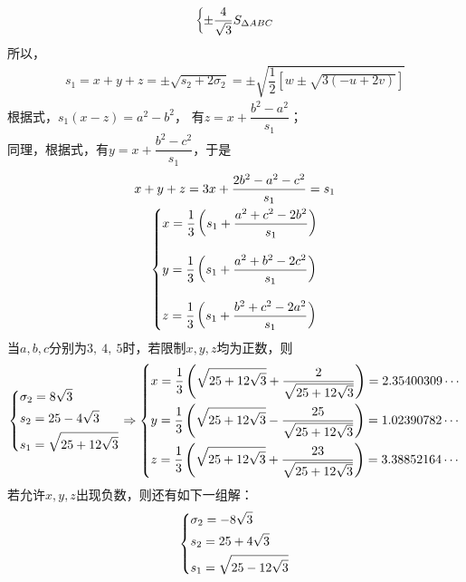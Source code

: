 \begin{enumerate}[label={【\textbf{例\thechapter.\arabic*}】},
 leftmargin=\inteval{\myenumleftmargin}pt,
 itemsep=\inteval{\myenumitempsep}pt,
 itemindent=\inteval{\myenumitemindent}pt]
\begin{align*}
\begin{dcases}
        \pm\dfrac{4}{\sqrt{3}}S_{\Delta ABC} 
    \end{dcases}
\end{align*}
所以，
\begin{gather*}
    s_1=x+y+z=\pm\sqrt{s_2+2\sigma_2 }=
    \pm \sqrt{\dfrac{1}{2}[w\pm\sqrt{3(-u+2v)}]}
\end{gather*}
根据式，$ s_1(x-z)=a^2-b^2 $，
有$ z=x+\dfrac{b^2-a^2}{s_1} $；\\
同理，根据式，有$ y=x+\dfrac{b^2-c^2}{s_1} $，于是
\begin{gather*}
    x+y+z=3x+\dfrac{2b^2-a^2-c^2}{s_1}=s_1 \\
    \begin{dcases}
        x=\dfrac{1}{3}\left(s_1+\dfrac{a^2+c^2-2b^2}{s_1}\right)\\[3mm]
        y=\dfrac{1}{3}\left(s_1+\dfrac{a^2+b^2-2c^2}{s_1}\right)\\[3mm]
        z=\dfrac{1}{3}\left(s_1+\dfrac{b^2+c^2-2a^2}{s_1}\right)
    \end{dcases}
\end{gather*}
当$ a,b,c $分别为$ 3,\ 4,\ 5 $时，若限制$ x,y,z $均为正数，则
\begin{gather*}
\begin{dcases}
    \sigma_2 =8\sqrt{3} \\        
    s_2 =25- 4\sqrt{3} \\
    s_1=\sqrt{25 + 12\sqrt{3}}
\end{dcases}
\Rightarrow 
\begin{dcases}
    x =\dfrac{1}{3}\left(\sqrt{25 + 12\sqrt{3}}+
    \dfrac{2}{\sqrt{25 + 12\sqrt{3}}}\right)=2.35400309 \cdots\\
    y =\dfrac{1}{3}\left(\sqrt{25 + 12\sqrt{3}}-
    \dfrac{25}{\sqrt{25 + 12\sqrt{3}}}\right)= 1.02390782 \cdots\\
    z =\dfrac{1}{3}\left(\sqrt{25 + 12\sqrt{3}}+
    \dfrac{23}{\sqrt{25 + 12\sqrt{3}}}\right)= 3.38852164 \cdots 
\end{dcases}
\end{gather*}
若允许$ x,y,z $出现负数，则还有如下一组解：
\begin{align*}
    \begin{dcases}
        \sigma_2 = -8\sqrt{3} \\        
        s_2 = 25+ 4\sqrt{3} \\
        s_1=\sqrt{25 - 12\sqrt{3}}
    \end{dcases}

\end{align*}
\end{enumerate}
